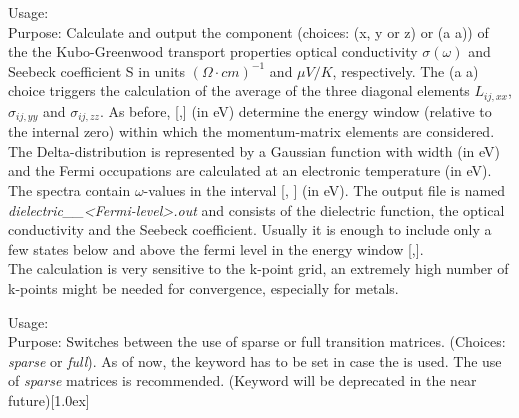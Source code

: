{
  \noindent
  Usage:          \\[1.0ex]
  Purpose: Calculate and output the   component (choices: (x, y or z) or (a a)) of the the Kubo-Greenwood transport properties optical conductivity $\sigma(\omega)$ and Seebeck coefficient 
  S in units $(\Omega \cdot cm)^{-1}$ and $\mu V /K$, respectively. The (a a) choice triggers the calculation of the average of the three diagonal elements $L_{ij,xx}$, $\sigma_{ij,yy}$ and $\sigma_{ij,zz}$.
  As before, [,] (in eV) determine the energy window (relative to the internal zero) within which the momentum-matrix elements are considered. The Delta-distribution is 
  represented by a Gaussian function with width  (in eV) and the Fermi occupations are calculated at an electronic temperature  (in eV). The spectra contain  $\omega$-values 
  in the interval [, ] (in eV). The output file is named \textit{dielectric\_}\textit{\_}\textit{<Fermi-level>}\textit{.out} and consists of the dielectric function,
  the optical conductivity and the Seebeck coefficient. 
  Usually it is enough to include only a few states below and above the fermi level in the 
  energy window [,].\\
  The calculation is very sensitive to the k-point grid, an extremely high number of k-points might be needed for convergence, especially for metals.\\[1.0ex]
}

{
  \noindent
  Usage:  \\[1.0ex]
  Purpose: Switches between the use of sparse or full transition matrices. (Choices: \textit{sparse} or \textit{full}). As of now, the keyword has to be set in case the  is used. The use of \textit{sparse} matrices is recommended.
  (Keyword will be deprecated in the near future)[1.0ex]
}
